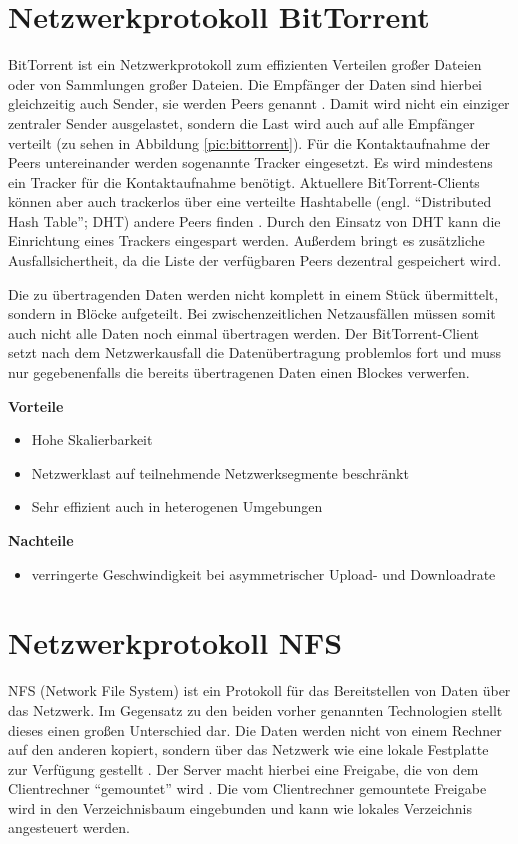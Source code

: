 \section{Netzwerkprotokoll BitTorrent}
BitTorrent ist ein Netzwerkprotokoll zum effizienten Verteilen großer Dateien oder von Sammlungen großer Dateien. Die Empfänger der Daten sind hierbei gleichzeitig auch Sender, sie werden Peers genannt \cite{btspec}. Damit wird nicht ein einziger zentraler Sender ausgelastet, sondern die Last wird auch auf alle Empfänger verteilt (zu sehen in Abbildung \ref{pic:bittorrent}). Für die Kontaktaufnahme der Peers untereinander werden sogenannte Tracker eingesetzt. Es wird mindestens ein Tracker für die Kontaktaufnahme benötigt. Aktuellere BitTorrent-Clients können aber auch trackerlos über eine verteilte Hashtabelle (engl. ``Distributed Hash Table''; DHT) andere Peers finden \cite{dhtspec}. Durch den Einsatz von DHT kann die Einrichtung eines Trackers eingespart werden. Außerdem bringt es zusätzliche Ausfallsichertheit, da die Liste der verfügbaren Peers dezentral gespeichert wird. 


Die zu übertragenden Daten werden nicht komplett in einem Stück übermittelt, sondern in Blöcke aufgeteilt. Bei zwischenzeitlichen Netzausfällen müssen somit auch nicht alle Daten noch einmal übertragen werden. Der BitTorrent-Client setzt nach dem Netzwerkausfall die Datenübertragung problemlos fort und muss nur gegebenenfalls die bereits übertragenen Daten einen Blockes verwerfen.

\textbf{Vorteile}
\begin{itemize}
 \item Hohe Skalierbarkeit
 \item Netzwerklast auf teilnehmende Netzwerksegmente beschränkt
 \item Sehr effizient auch in heterogenen Umgebungen
\end{itemize}

\textbf{Nachteile}
\begin{itemize}
  \item verringerte Geschwindigkeit bei asymmetrischer Upload- und Downloadrate
\end{itemize}

\section{Netzwerkprotokoll NFS}
NFS (Network File System) ist ein Protokoll für das Bereitstellen von Daten über das Netzwerk. Im Gegensatz zu den beiden vorher genannten Technologien stellt dieses einen großen Unterschied dar. Die Daten werden nicht von einem Rechner auf den anderen kopiert, sondern über das Netzwerk wie eine lokale Festplatte zur Verfügung gestellt \cite{nfsspec}. Der Server macht hierbei eine Freigabe, die von dem Clientrechner ``gemountet'' wird \cite{nfslinux}. Die vom Clientrechner gemountete Freigabe wird in den Verzeichnisbaum eingebunden und kann wie lokales Verzeichnis angesteuert werden.

